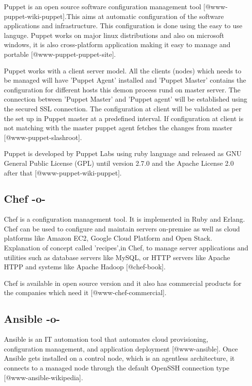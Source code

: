 Puppet is an open source software configuration management
tool [@www-puppet-wiki-puppet].This aims at automatic
configuration of the software applications and infrastructure. This
configuration is done using the easy to use languge.  Puppet works on
major linux distributions and also on microsoft windows, it is also
cross-platform application making it easy to manage and
portable [@www-puppet-puppet-site].

Puppet works with a client server model. All the clients (nodes)
which needs to be managed will have 'Puppet Agent' installed and
'Puppet Master' contains the configuration for different hosts this
demon process rund on master server. The connection between 'Puppet
Master' and 'Puppet agent' will be established using the secured SSL
connection. The configuration at client will be validated as per the
set up in Puppet master at a predefined interval. If configuration at
client is not matching with the master puppet agent fetches the
changes from master [@www-puppet-slashroot].

Puppet is developed by Puppet Labs using ruby language and released as
GNU General Public License (GPL) until version 2.7.0 and the Apache
License 2.0 after that [@www-puppet-wiki-puppet].


  
\subsection{Chef -o-}

Chef is a configuration management tool. It is implemented in Ruby and
Erlang. Chef can be used to configure and maintain servers on-premise
as well as cloud platforms like Amazon EC2, Google Cloud Platform and
Open Stack. Explanation of concept called 'recipes',in Chef, to
manage server applications and utilities such as database servers like
MySQL, or HTTP servers like Apache HTPP and systems like Apache
Hadoop [@chef-book].

Chef is available in open source version and it also has commercial
products for the companies which need it [@www-chef-commercial].



\subsection{Ansible -o-}

Ansible is an IT automation tool that automates cloud provisioning,
configuration management, and application
deployment [@www-ansible]. Once Ansible gets installed on a
control node, which is an agentless architecture, it connects to a
managed node through the default OpenSSH connection
type [@www-ansible-wikipedia].

